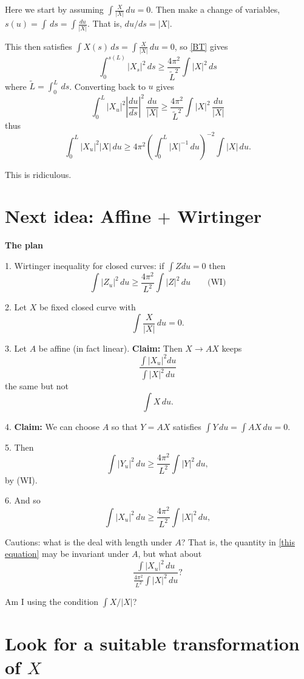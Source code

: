 \documentclass{amsart}
\begin{document}
Here we start by assuming  $\int \frac{X}{|X|}\,du=0$.  Then make a change of variables, $s(u)=\int \,ds=\int \frac{du}{|X|}$.   That is, $du/ds=|X|$.  

This then satisfies $\int X(s)\,ds=\int  \frac{X}{|X|}\,du=0$, so \eqref{BT} gives
\[ \int_0^{s(L)} |X_s|^2 \,ds \ge \frac{4\pi^2}{\tilde{L}^2}\int |X|^2\,ds\]
where $\tilde{L}=\int_0^L \,ds$.  Converting back to $u$ gives
\[ \int_0^{L} |X_u|^2|\frac{du}{ds}|^2 \,\frac{du}{|X|} \ge \frac{4\pi^2}{\tilde{L}^2}\int |X|^2\,\frac{du}{|X|}\]
thus
\[ \int_0^{L} |X_u|^2|X| \,du\ge {4\pi^2}\left(\int_0^L |X|^{-1}\,du \right)^{-2}\int |X|\,{du}.\]

This is ridiculous.

\clearpage

\section*{Next idea:  Affine $+$ Wirtinger}

\textbf{The plan}
 
 1.  Wirtinger inequality for closed curves:  if $\int Z du =0$ then 
 $$\int |Z_u|^2 \,du \ge \frac{4\pi^2}{L^2}\int |Z|^2 \,du  \quad \quad \text{(WI)}$$
 
 2.  Let $X$ be fixed closed curve with $$\int \frac{X}{|X|}\,du =0.$$
 
 3.  Let $A$ be affine (in fact linear).  \textbf{Claim: }Then $X\rightarrow AX$ keeps 
 \begin{equation}\frac{\int |X_u|^2 du }{\int |X|^2 \,du}  \label{this equation} \end{equation}
 the same but not $$\int X\,du.$$
 
 4.   \textbf{Claim:} We can choose $A$ so that $Y=AX$ satisfies $\int Y \,du =\int AX\,du=0.$
 
 5.  Then $$\int |Y_u|^2 \,du \ge \frac{4\pi^2}{L^2}\int {|Y|^2}\,du,$$ by (WI).
 
 6.  And so $$\int |X_u|^2 \,du \ge \frac{4\pi^2}{L^2}\int {|X|^2}\,du,$$


Cautions:  what is the deal with length under $A$? That is, the quantity in \eqref{this equation} may be invariant under $A$, but what about
\begin{equation}\frac{ \int |{X}_u|^2 \,du}{ \frac{4\pi^2}{L^2}\int |{X}|^2\,du } ? \end{equation}

Am I using the condition $\int X/|X|$?


 \section*{Look for a suitable transformation of $X$}
  
\end{document}
